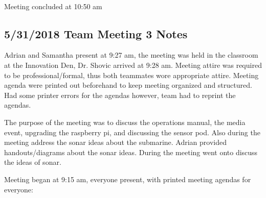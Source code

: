 \documentclass[12pt]{article}
\begin{document}
			\noindent
			\\Meeting concluded at 10:50 am
			
			\clearpage
		
		\subsection{5/31/2018 Team Meeting 3 Notes}
			
			\noindent
			Adrian and Samantha present at 9:27 am, the meeting was held in the classroom at the Innovation Den, Dr. Shovic arrived at 9:28 am. Meeting attire was required to be professional/formal, thus both teammates wore appropriate attire. Meeting agenda were printed out beforehand to keep meeting organized and structured. Had some printer errors for the agendas however, team had to reprint the agendas. 
			
			\noindent
			The purpose of the meeting was to discuss the operations manual, the media event, upgrading the raspberry pi, and discussing the sensor pod. Also during the meeting address the sonar ideas about the submarine. Adrian provided handouts/diagrams about the sonar ideas. During the meeting went onto discuss the ideas of sonar.
			
			\noindent
			Meeting began at 9:15 am, everyone present, with printed meeting agendas for everyone:
			
\end{document}
